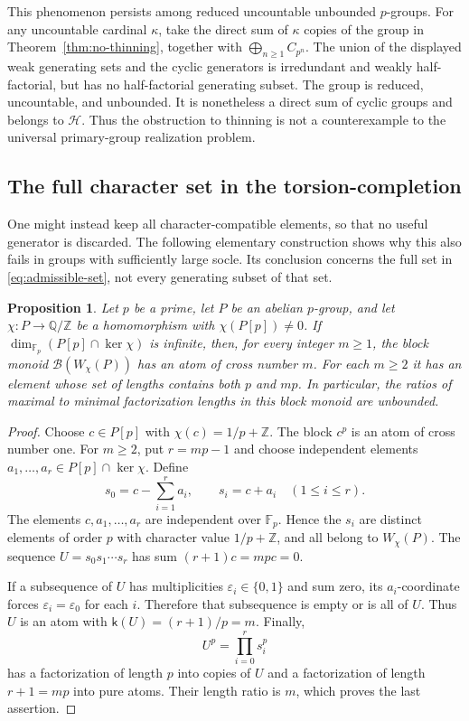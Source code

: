 \documentclass[11pt,reqno]{amsart}
\numberwithin{equation}{section}
\newtheorem{proposition}[theorem]{Proposition}
\theoremstyle{definition}
\theoremstyle{remark}
\newcommand{\Z}{\mathbb Z}
\newcommand{\Q}{\mathbb Q}
\newcommand{\HF}{\mathcal H}
\newcommand{\B}{\mathcal B}
\begin{document}
This phenomenon persists among reduced uncountable unbounded
$p$-groups. For any uncountable cardinal $\kappa$,
take the direct sum of $\kappa$ copies of the group in
Theorem~\ref{thm:no-thinning}, together with
$\bigoplus_{n\ge1}C_{p^n}$. The union of the displayed weak
generating sets and the cyclic generators is irredundant and
weakly half-factorial, but has no half-factorial generating
subset. The group is reduced, uncountable, and unbounded.
It is nonetheless a direct sum of cyclic groups and belongs to
$\HF$. Thus the obstruction to thinning is not a counterexample
to the universal primary-group realization problem.

\subsection{The full character set in the torsion-completion}

One might instead keep all character-compatible elements, so that
no useful generator is discarded. The following elementary
construction shows why this also fails in groups with sufficiently
large socle. Its conclusion concerns the full set in
\eqref{eq:admissible-set}, not every generating subset of that set.

\begin{proposition}\label{prop:full-character-atoms}
Let $p$ be a prime, let $P$ be an abelian $p$-group, and let $\chi:P\to\Q/\Z$ be a
homomorphism with $\chi(P[p])\ne0$. If
$\dim_{\mathbb F_p}(P[p]\cap\ker\chi)$ is infinite, then, for
every integer $m\ge1$, the block monoid
$\B(W_\chi(P))$ has an atom of cross number $m$.
For each $m\ge2$ it has an element whose set of lengths contains
both $p$ and $mp$. In particular, the ratios of maximal to
minimal factorization lengths in this block monoid are unbounded.
\end{proposition}

\begin{proof}
Choose $c\in P[p]$ with $\chi(c)=1/p+\Z$. The block $c^p$
is an atom of cross number one. For $m\ge2$, put $r=mp-1$
and choose independent elements
$a_1,\ldots,a_r\in P[p]\cap\ker\chi$. Define
\[
 s_0=c-\sum_{i=1}^r a_i,\qquad
 s_i=c+a_i\quad(1\le i\le r).
\]
The elements $c,a_1,\ldots,a_r$ are independent over
$\mathbb F_p$. Hence the $s_i$ are distinct elements of order
$p$ with character value $1/p+\Z$, and all belong to
$W_\chi(P)$. The sequence $U=s_0s_1\cdots s_r$ has sum
$(r+1)c=mpc=0$.

If a subsequence of $U$ has multiplicities
$\varepsilon_i\in\{0,1\}$ and sum zero, its $a_i$-coordinate
forces $\varepsilon_i=\varepsilon_0$ for each $i$. Therefore
that subsequence is empty or is all of $U$. Thus $U$ is an atom
with $\mathsf k(U)=(r+1)/p=m$. Finally,
\[
 U^p=\prod_{i=0}^r s_i^p
\]
has a factorization of length $p$ into copies of $U$ and a
factorization of length $r+1=mp$ into pure atoms. Their length
ratio is $m$, which proves the last assertion.
\end{proof}
\end{document}
